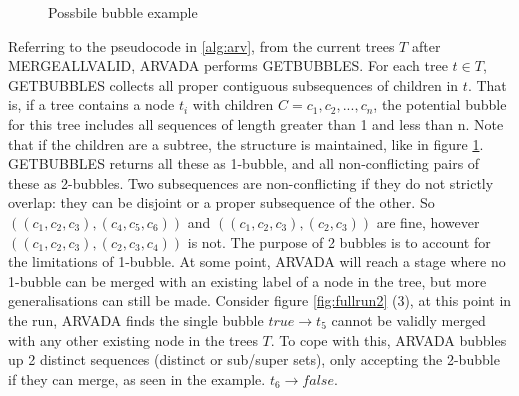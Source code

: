 \begin{figure}[H]
\centering
{}


\caption{Possbile bubble example}
\label{fig: possible bubble}
\end{figure}

Referring to the pseudocode in \ref{alg:arv}, from the current trees $T$ after MERGEALLVALID, ARVADA performs GETBUBBLES. For each tree $t \in T$, GETBUBBLES collects all proper contiguous subsequences of children in $t$. That is, if a tree contains a node $t_i$ with children $C = c_1, c_2,..., c_n$, the potential bubble for this tree includes all sequences of length greater than 1 and less than n. Note that if the children are a subtree, the structure is maintained, like in figure \ref{fig: possible bubble}. GETBUBBLES returns all these as 1-bubble, and all non-conflicting pairs of these as 2-bubbles. Two subsequences are non-conflicting if they do not strictly overlap: they can be disjoint or a proper subsequence of the other. So $((c_1, c_2, c_3), (c_4, c_5, c_6))$ and $((c_1, c_2, c_3), (c_2, c_3))$ are fine, however $((c_1, c_2, c_3), (c_2, c_3, c_4))$ is not. The purpose of 2 bubbles is to account for the limitations of 1-bubble. At some point, ARVADA will reach a stage where no 1-bubble can be merged with an existing label of a node in the tree, but more generalisations can still be made. Consider figure \ref{fig:fullrun2} (3), at this point in the run, ARVADA finds the single bubble $true \rightarrow t_5$ cannot be validly merged with any other existing node in the trees $T$. To cope with this, ARVADA bubbles up 2 distinct sequences (distinct or sub/super sets), only accepting the 2-bubble if they can merge, as seen in the example. $t_6 \rightarrow false$. 
\vspace{\baselineskip}

